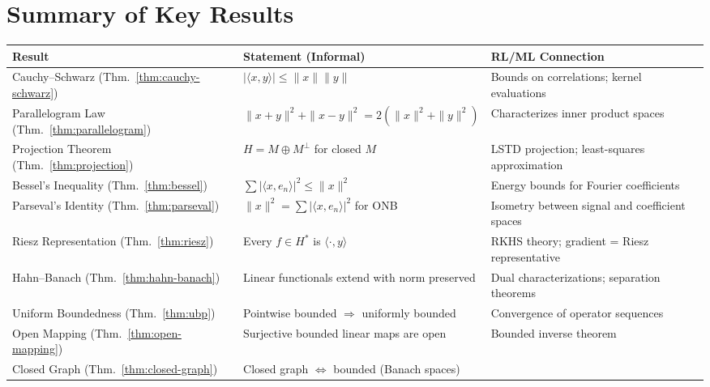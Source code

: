 \documentclass[11pt,a4paper]{article}
\theoremstyle{definition}
\theoremstyle{plain}
\theoremstyle{remark}
\begin{document}
\section{Summary of Key Results}\label{sec:summary}

\begin{center}
\small
\begin{tabular}{p{4.0cm} p{5.5cm} p{4.5cm}}
\toprule
\textbf{Result} & \textbf{Statement (Informal)} & \textbf{RL/ML Connection} \\
\midrule
Cauchy--Schwarz (Thm.~\ref{thm:cauchy-schwarz})
    & $|\langle x,y \rangle| \leq \|x\|\|y\|$
    & Bounds on correlations; kernel evaluations \\
\addlinespace
Parallelogram Law (Thm.~\ref{thm:parallelogram})
    & $\|x+y\|^2 + \|x-y\|^2 = 2(\|x\|^2 + \|y\|^2)$
    & Characterizes inner product spaces \\
\addlinespace
Projection Theorem (Thm.~\ref{thm:projection})
    & $H = M \oplus M^\perp$ for closed $M$
    & LSTD projection; least-squares approximation \\
\addlinespace
Bessel's Inequality (Thm.~\ref{thm:bessel})
    & $\sum |\langle x, e_n \rangle|^2 \leq \|x\|^2$
    & Energy bounds for Fourier coefficients \\
\addlinespace
Parseval's Identity (Thm.~\ref{thm:parseval})
    & $\|x\|^2 = \sum |\langle x, e_n \rangle|^2$ for ONB
    & Isometry between signal and coefficient spaces \\
\addlinespace
Riesz Representation (Thm.~\ref{thm:riesz})
    & Every $f \in H^*$ is $\langle \cdot, y \rangle$
    & RKHS theory; gradient = Riesz representative \\
\addlinespace
Hahn--Banach (Thm.~\ref{thm:hahn-banach})
    & Linear functionals extend with norm preserved
    & Dual characterizations; separation theorems \\
\addlinespace
Uniform Boundedness (Thm.~\ref{thm:ubp})
    & Pointwise bounded $\Rightarrow$ uniformly bounded
    & Convergence of operator sequences \\
\addlinespace
Open Mapping (Thm.~\ref{thm:open-mapping})
    & Surjective bounded linear maps are open
    & Bounded inverse theorem \\
\addlinespace
Closed Graph (Thm.~\ref{thm:closed-graph})
    & Closed graph $\Leftrightarrow$ bounded (Banach spaces)

\end{tabular}
\end{center}
\end{document}
